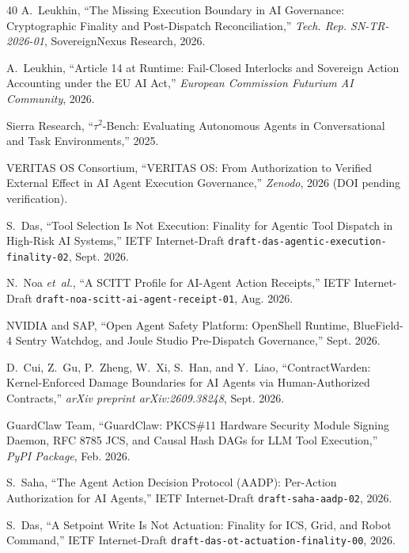 \documentclass[10pt,journal,compsoc]{IEEEtran}
\begin{document}
\begin{thebibliography}{40}
A.~Leukhin, ``The Missing Execution Boundary in AI Governance: Cryptographic Finality and Post-Dispatch Reconciliation,'' \emph{Tech. Rep. SN-TR-2026-01}, SovereignNexus Research, 2026.

A.~Leukhin, ``Article 14 at Runtime: Fail-Closed Interlocks and Sovereign Action Accounting under the EU AI Act,'' \emph{European Commission Futurium AI Community}, 2026.

Sierra Research, ``$\tau^2$-Bench: Evaluating Autonomous Agents in Conversational and Task Environments,'' 2025.

VERITAS OS Consortium, ``VERITAS OS: From Authorization to Verified External Effect in AI Agent Execution Governance,'' \emph{Zenodo}, 2026 (DOI pending verification).

S.~Das, ``Tool Selection Is Not Execution: Finality for Agentic Tool Dispatch in High-Risk AI Systems,'' IETF Internet-Draft \texttt{draft-das-agentic-execution-finality-02}, Sept. 2026.

N.~Noa \emph{et~al.}, ``A SCITT Profile for AI-Agent Action Receipts,'' IETF Internet-Draft \texttt{draft-noa-scitt-ai-agent-receipt-01}, Aug. 2026.

NVIDIA and SAP, ``Open Agent Safety Platform: OpenShell Runtime, BlueField-4 Sentry Watchdog, and Joule Studio Pre-Dispatch Governance,'' Sept. 2026.

D.~Cui, Z.~Gu, P.~Zheng, W.~Xi, S.~Han, and Y.~Liao, ``ContractWarden: Kernel-Enforced Damage Boundaries for AI Agents via Human-Authorized Contracts,'' \emph{arXiv preprint arXiv:2609.38248}, Sept. 2026.

GuardClaw Team, ``GuardClaw: PKCS\#11 Hardware Security Module Signing Daemon, RFC 8785 JCS, and Causal Hash DAGs for LLM Tool Execution,'' \emph{PyPI Package}, Feb. 2026.

S.~Saha, ``The Agent Action Decision Protocol (AADP): Per-Action Authorization for AI Agents,'' IETF Internet-Draft \texttt{draft-saha-aadp-02}, 2026.

S.~Das, ``A Setpoint Write Is Not Actuation: Finality for ICS, Grid, and Robot Command,'' IETF Internet-Draft \texttt{draft-das-ot-actuation-finality-00}, 2026.


\end{thebibliography}
\end{document}
